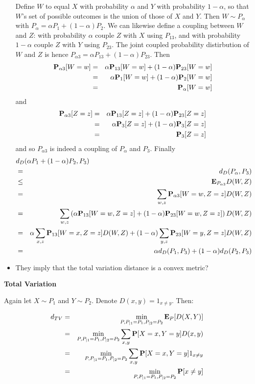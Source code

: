 \documentclass[11pt]{article} \usepackage{amssymb}
\newcommand{\E}{{\bf E}} \newcommand{\Cov}{{\bf Cov}}
\begin{document}
\begin{itemize}
    Define $W$ to equal $X$ with probability $\alpha$ and $Y$ with probability
    $1-\alpha$, so that $W$'s set of possible outcomes is the union of those of
    $X$ and $Y$. Then $W\sim P_\alpha$ with  $P_\alpha=\alpha P_1 +(1-\alpha)P_2$. We can likewise define a 
    coupling between $W$ and $Z$: with probability $\alpha$ couple $Z$ with
    $X$ using $P_{13}$, and with probability $1-\alpha$ couple $Z$ with $Y$
    using $P_{23}$. The joint coupled probability distirbution of $W$ and $Z$
    is hence $P_{\alpha 3}=\alpha P_{13} +(1-\alpha)P_{23}$. Then
    \begin{eqnarray*}
      \P_{\alpha 3}[W=w]&=&\alpha \P_{13}[W=w] +(1-\alpha)\P_{23}[W=w]
      \\ &=& \alpha \P_1[W=w]+(1-\alpha)\P_2[W=w]
      \\ &=& \P_\alpha[W=w]
    \end{eqnarray*}
    and
    \begin{eqnarray*}
      \P_{\alpha 3}[Z=z]&=&\alpha \P_{13}[Z=z] +(1-\alpha)\P_{23}[Z=z]
      \\ &=& \alpha \P_3[Z=z]+(1-\alpha)\P_3[Z=z]
      \\ &=& \P_3[Z=z]
    \end{eqnarray*}
    and so $P_{\alpha 3}$ is indeed a coupling of $P_\alpha$ and $P_3$. Finally
    \begin{eqnarray*}
      \lefteqn{d_D(\alpha P_1+(1-\alpha)P_2,P_3)}
      \\ &=& d_D(P_\alpha,P_3)
      \\ &\leq&  \E_{P_{\alpha 3}}D(W,Z)
      \\ &=&  \sum_{w,z}\P_{\alpha 3}[W=w,Z=z]D(W,Z)
      \\ &=& \sum_{w,z}\left(\alpha \P_{13}[W=w,Z=z] +(1-\alpha)\P_{23}[W=w,Z=z]\right)D(W,Z)
      \\ &=& \alpha \sum_{x,z}\P_{13}[W=x,Z=z]D(W,Z) +(1-\alpha)\sum_{y,z}\P_{23}[W=y,Z=z]D(W,Z)
      \\ &=& \alpha d_D(P_1,P_3)+(1-\alpha)d_D(P_2,P_3)
    \end{eqnarray*}
    \item They imply that the total variation distance is a convex metric? 
\end{itemize}

{\bf Total Variation}

Again let $X\sim P_1$ and $Y\sim P_2$. Denote $D(x,y)=1_{x\neq y}$. Then:

\begin{eqnarray*}
  d_{TV}&=&\min_{P, P_{|1}=P_1, P_{|2}=P_2}\E_P[D(X,Y)]
  \\ &=& \min_{P, P_{|1}=P_1, P_{|2}=P_2}\sum_{x,y}\P[X=x,Y=y]D(x,y)
  \\ &=& \min_{P, P_{|1}=P_1, P_{|2}=P_2}\sum_{x,y}\P[X=x,Y=y]1_{x\neq y}
  \\ &=& \min_{P, P_{|1}=P_1, P_{|2}=P_2}\P[x\neq y]
\end{eqnarray*}
\end{document}
